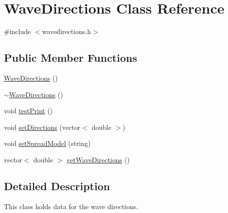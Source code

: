 \hypertarget{class_wave_directions}{\section{Wave\-Directions Class Reference}
\label{class_wave_directions}
}


{\ttfamily \#include $<$wavedirections.\-h$>$}

\subsection*{Public Member Functions}
\begin{DoxyCompactItemize}
\item 
\hyperlink{class_wave_directions_a7d754155f7d3f22bae9224dd292bb32f}{Wave\-Directions} ()
\item 
\hyperlink{class_wave_directions_a44c089a84a0f32128e3936244486c79c}{$\sim$\-Wave\-Directions} ()
\item 
void \hyperlink{class_wave_directions_a4f2850568a41b6edfac8b74da9ef3283}{test\-Print} ()
\item 
void \hyperlink{class_wave_directions_a83344e448693bff3d145bce0f9e44fc3}{set\-Directions} (vector$<$ double $>$)
\item 
void \hyperlink{class_wave_directions_a42f3f43f6c9098abc42a327c5837b7c8}{set\-Spread\-Model} (string)
\item 
vector$<$ double $>$ \hyperlink{class_wave_directions_a064919ae735253384829adccdefffc60}{get\-Wave\-Directions} ()
\end{DoxyCompactItemize}


\subsection{Detailed Description}
This class holds data for the wave directions. 

